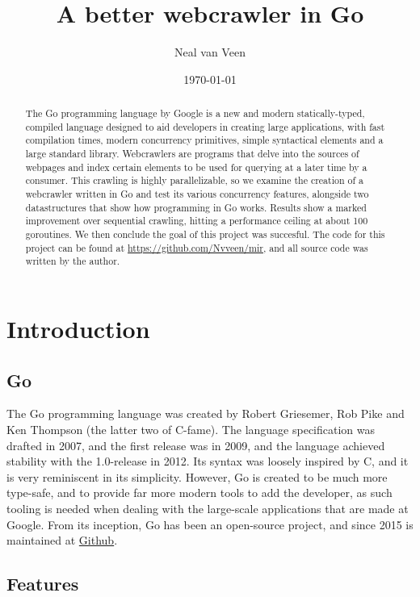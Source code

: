 \documentclass[]{article}
\title{A better webcrawler in Go\\\vspace{0.5em}{\large Multimedia Information Retrieval}}
\author{Neal van Veen}
\date{\today}
\begin{document}
\maketitle
\begin{abstract}
The Go programming language by Google is a new and modern
statically-typed, compiled language designed to aid developers in
creating large applications, with fast compilation times, modern
concurrency primitives, simple syntactical elements and a large standard
library. Webcrawlers are programs that delve into the sources of
webpages and index certain elements to be used for querying at a later
time by a consumer. This crawling is highly parallelizable, so we
examine the creation of a webcrawler written in Go and test its various
concurrency features, alongside two datastructures that show how
programming in Go works. Results show a marked improvement over
sequential crawling, hitting a performance ceiling at about 100
goroutines. We then conclude the goal of this project was succesful. The
code for this project can be found at
\url{https://github.com/Nvveen/mir}, and all source code was written by
the author.
\end{abstract}

\section{Introduction}\label{introduction}

\subsection{Go}\label{go}

The Go programming language was created by Robert Griesemer, Rob Pike
and Ken Thompson (the latter two of C-fame). The language specification
was drafted in 2007, and the first release was in 2009, and the language
achieved stability with the 1.0-release in 2012. Its syntax was loosely
inspired by C, and it is very reminiscent in its simplicity. However, Go
is created to be much more type-safe, and to provide far more modern
tools to add the developer, as such tooling is needed when dealing with
the large-scale applications that are made at Google. From its
inception, Go has been an open-source project, and since 2015 is
maintained at \href{https://github.com/golang}{Github}.

\subsection{Features}\label{features}
\end{document}
